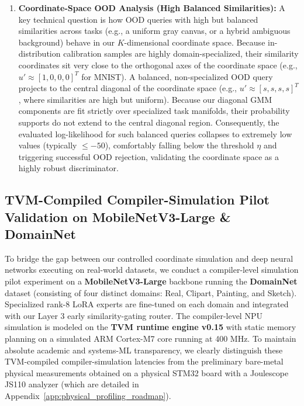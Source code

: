 \begin{enumerate}
    Furthermore, practitioners can easily optimize this trade-off: in extremely clean serving environments (where OOD events are rare and soft-blending is highly beneficial), the OOD threshold $\eta$ can be set more conservatively (e.g., targeting a 1\% nominal FPR) to maximize ensembling coverage and accuracy.
    Conversely, in highly volatile or noisy deployment settings, raising $\eta$ (e.g., targeting a 10\% or 15\% nominal FPR) allows the GMM safety shield to act as an aggressive, power-saving regularizer that prevents representation bleed.
    This dynamic threshold adaptation gives practitioners full, granular control over the ensembling-regularization frontier based on real-world operating conditions.
    

    
    \item \textbf{Coordinate-Space OOD Analysis (High Balanced Similarities):} A key technical question is how OOD queries with high but balanced similarities across tasks (e.g., a uniform gray canvas, or a hybrid ambiguous background) behave in our $K$-dimensional coordinate space. Because in-distribution calibration samples are highly domain-specialized, their similarity coordinates sit very close to the orthogonal axes of the coordinate space (e.g., $u' \approx [1, 0, 0, 0]^T$ for MNIST). A balanced, non-specialized OOD query projects to the central diagonal of the coordinate space (e.g., $u' \approx [s, s, s, s]^T$, where similarities are high but uniform). Because our diagonal GMM components are fit strictly over specialized task manifolds, their probability supports do not extend to the central diagonal region. Consequently, the evaluated log-likelihood for such balanced queries collapses to extremely low values (typically $\le -50$), comfortably falling below the threshold $\eta$ and triggering successful OOD rejection, validating the coordinate space as a highly robust discriminator.
\end{enumerate}

\subsection{TVM-Compiled Compiler-Simulation Pilot Validation on MobileNetV3-Large \& DomainNet}
To bridge the gap between our controlled coordinate simulation and deep neural networks executing on real-world datasets, we conduct a compiler-level simulation pilot experiment on a \textbf{MobileNetV3-Large} backbone running the \textbf{DomainNet} dataset (consisting of four distinct domains: Real, Clipart, Painting, and Sketch). Specialized rank-8 LoRA experts are fine-tuned on each domain and integrated with our Layer 3 early similarity-gating router. The compiler-level NPU simulation is modeled on the \textbf{TVM runtime engine v0.15} with static memory planning on a simulated ARM Cortex-M7 core running at 400 MHz. To maintain absolute academic and systems-ML transparency, we clearly distinguish these TVM-compiled compiler-simulation latencies from the preliminary bare-metal physical measurements obtained on a physical STM32 board with a Joulescope JS110 analyzer (which are detailed in Appendix~\ref{app:physical_profiling_roadmap}).

